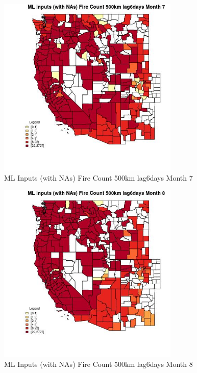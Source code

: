 \clearpage 

\begin{figure} 
\centering  
\includegraphics[width=0.77\textwidth]{Code_Outputs/Report_ML_input_PM25_Step4_part_f_de_duplicated_aves_prioritize_24hr_obswNAs_CountyFire_Count_500km_lag6daysmedianMonth7.jpg} 
\caption{\label{fig:Report_ML_input_PM25_Step4_part_f_de_duplicated_aves_prioritize_24hr_obswNAsCountyFire_Count_500km_lag6daysmedianMonth7}ML Inputs (with NAs) Fire Count 500km lag6days Month 7} 
\end{figure} 
 

\begin{figure} 
\centering  
\includegraphics[width=0.77\textwidth]{Code_Outputs/Report_ML_input_PM25_Step4_part_f_de_duplicated_aves_prioritize_24hr_obswNAs_CountyFire_Count_500km_lag6daysmedianMonth8.jpg} 
\caption{\label{fig:Report_ML_input_PM25_Step4_part_f_de_duplicated_aves_prioritize_24hr_obswNAsCountyFire_Count_500km_lag6daysmedianMonth8}ML Inputs (with NAs) Fire Count 500km lag6days Month 8} 
\end{figure} 
 

